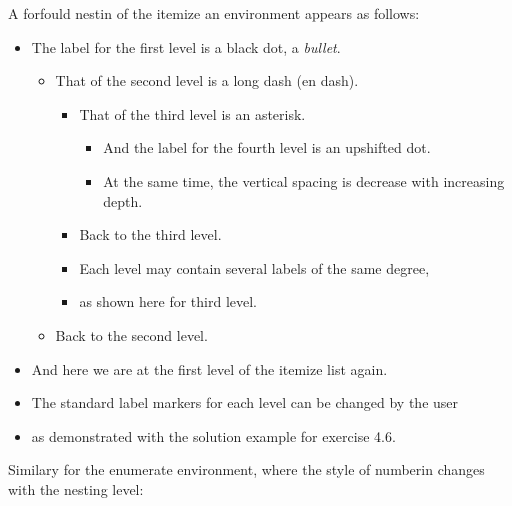 \documentclass{article}
\begin{document}
A forfould nestin of the itemize an environment appears as follows:
\begin{itemize}
  \item The label for the first level is a black dot, a \emph{bullet}.
  \begin{itemize}
     \item That of the second level is a long dash (en dash).
     \begin{itemize}
        \item That of the third level is an asterisk.
        \begin{itemize}
           \item And the label for the fourth level is an upshifted dot.
           \item At the same time, the vertical spacing is decrease with
                 increasing depth.
        \end{itemize}  
        \item Back to the third level.
        \item Each level may contain several labels of the same degree,
        \item as shown here for third level.
     \end{itemize}
     \item Back to the second level.
  \end{itemize}
  \item And here we are at the first level of the itemize list again.
  \item The standard label markers for each level can be changed by
        the user
  \item as demonstrated with the solution example for exercise 4.6.
\end{itemize}
Similary for the enumerate environment, where the style of numberin changes
with the nesting level:
\end{document}
